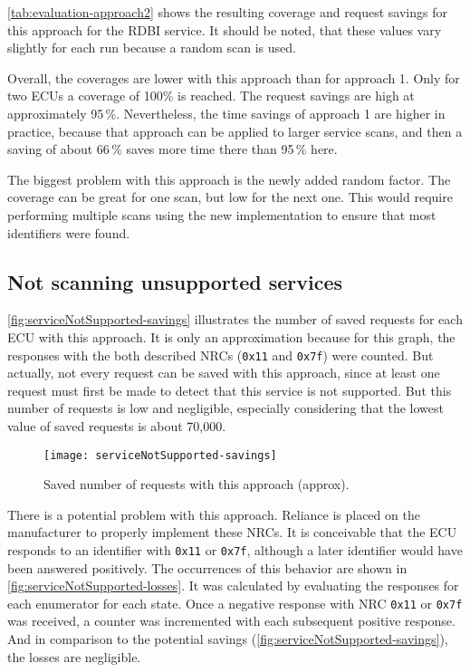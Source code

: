 \autoref{tab:evaluation-approach2} shows the resulting coverage and request savings for this approach for the RDBI service. It should be noted, that these values vary slightly for each run because a random scan is used.

Overall, the coverages are lower with this approach than for approach 1. Only for two ECUs a coverage of 100\% is reached. The request savings are high at approximately 95\,\%. Nevertheless, the time savings of approach 1 are higher in practice, because that approach can be applied to larger service scans, and then a saving of about 66\,\% saves more time there than 95\,\% here.

The biggest problem with this approach is the newly added random factor. The coverage can be great for one scan, but low for the next one. This would require performing multiple scans using the new implementation to ensure that most identifiers were found.

\subsection{Not scanning unsupported services}

\autoref{fig:serviceNotSupported-savings} illustrates the number of saved requests for each ECU with this approach. It is only an approximation because for this graph, the responses with the both described NRCs (\texttt{0x11} and \texttt{0x7f}) were counted. But actually, not every request can be saved with this approach, since at least one request must first be made to detect that this service is not supported. But this number of requests is low and negligible, especially considering that the lowest value of saved requests is about 70,000.

\begin{figure}[H]
    \centering
    \texttt{[image: serviceNotSupported-savings]}
    \caption{Saved number of requests with this approach (approx).}
    \label{fig:serviceNotSupported-savings}
\end{figure}

There is a potential problem with this approach. Reliance is placed on the manufacturer to properly implement these NRCs. It is conceivable that the ECU responds to an identifier with \texttt{0x11} or \texttt{0x7f}, although a later identifier would have been answered positively. The occurrences of this behavior are shown in \autoref{fig:serviceNotSupported-losses}. It was calculated by evaluating the responses for each enumerator for each state. Once a negative response with NRC \texttt{0x11} or \texttt{0x7f} was received, a counter was incremented with each subsequent positive response.
And in comparison to the potential savings (\autoref{fig:serviceNotSupported-savings}), the losses are negligible.

